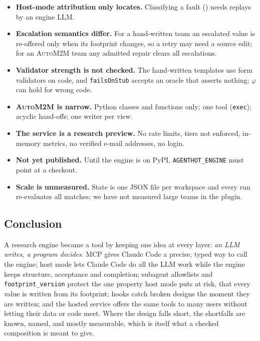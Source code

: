 \documentclass[10pt,a4paper]{article}
\newcommand{\auto}{\textsc{AutoM2M}}
\newcommand{\cc}{Claude Code}
\newcommand{\code}[1]{\texttt{#1}}
\begin{document}
\begin{itemize}
\item \textbf{Host-mode attribution only locates.} Classifying a fault
() needs replays by an engine LLM.
\item \textbf{Escalation semantics differ.} For a hand-written team an
escalated value is re-offered only when its footprint changes, so a retry may
need a source edit; for an \auto{} team any admitted repair clears all
escalations.
\item \textbf{Validator strength is not checked.} The hand-written templates
use form validators on code, and \code{failsOnStub} accepts an oracle that
asserts nothing; $\varphi$ can hold for wrong code.
\item \textbf{\auto{} is narrow.} Python classes and functions only; one tool
(\code{exec}); acyclic hand-offs; one writer per view.
\item \textbf{The service is a research preview.} No rate limits, tiers not
enforced, in-memory metrics, no verified e-mail addresses, no login.
\item \textbf{Not yet published.} Until the engine is on PyPI,
\code{AGENTHOT\_ENGINE} must point at a checkout.
\item \textbf{Scale is unmeasured.} State is one JSON file per workspace and
every run re-evaluates all matches; we have not measured large teams in the
plugin.
\end{itemize}

\subsection{Conclusion}

A research engine became a tool by keeping one idea at every layer:
\emph{an LLM writes, a program decides}. MCP gives \cc{} a precise, typed way
to call the engine; host mode lets \cc{} do all the LLM work while the engine
keeps structure, acceptance and completion; subagent allowlists and
\code{footprint\_version} protect the one property host mode puts at risk,
that every value is written from its footprint; hooks catch broken designs
the moment they are written; and the hosted service offers the same tools to
many users without letting their data or code meet. Where the design falls
short, the shortfalls are known, named, and mostly measurable, which is
itself what a checked composition is meant to give.

\end{document}

